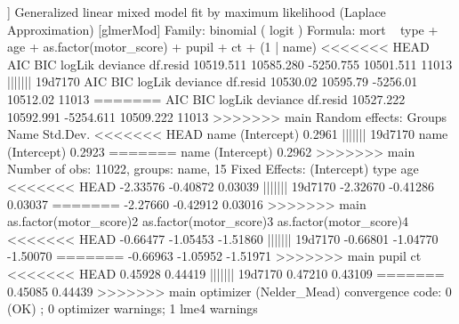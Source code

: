 \documentclass[
]{jss}
\begin{document}
\begin{CodeChunk}
\begin{CodeOutput}
[[4]]
Generalized linear mixed model fit by maximum likelihood (Laplace
  Approximation) [glmerMod]
 Family: binomial  ( logit )
Formula: mort ~ type + age + as.factor(motor_score) + pupil + ct + (1 |  
    name)
<<<<<<< HEAD
      AIC       BIC    logLik  deviance  df.resid 
10519.511 10585.280 -5250.755 10501.511     11013 
||||||| 19d7170
     AIC      BIC   logLik deviance df.resid 
10530.02 10595.79 -5256.01 10512.02    11013 
=======
      AIC       BIC    logLik  deviance  df.resid 
10527.222 10592.991 -5254.611 10509.222     11013 
>>>>>>> main
Random effects:
 Groups Name        Std.Dev.
<<<<<<< HEAD
 name   (Intercept) 0.2961  
||||||| 19d7170
 name   (Intercept) 0.2923  
=======
 name   (Intercept) 0.2962  
>>>>>>> main
Number of obs: 11022, groups:  name, 15
Fixed Effects:
            (Intercept)                     type                      age  
<<<<<<< HEAD
               -2.33576                 -0.40872                  0.03039  
||||||| 19d7170
               -2.32670                 -0.41286                  0.03037  
=======
               -2.27660                 -0.42912                  0.03016  
>>>>>>> main
as.factor(motor_score)2  as.factor(motor_score)3  as.factor(motor_score)4  
<<<<<<< HEAD
               -0.66477                 -1.05453                 -1.51860  
||||||| 19d7170
               -0.66801                 -1.04770                 -1.50070  
=======
               -0.66963                 -1.05952                 -1.51971  
>>>>>>> main
                  pupil                       ct  
<<<<<<< HEAD
                0.45928                  0.44419  
||||||| 19d7170
                0.47210                  0.43109  
=======
                0.45085                  0.44439  
>>>>>>> main
optimizer (Nelder_Mead) convergence code: 0 (OK) ; 0 optimizer warnings; 1 lme4 warnings 


\end{CodeOutput}
\end{CodeChunk}
\end{document}
